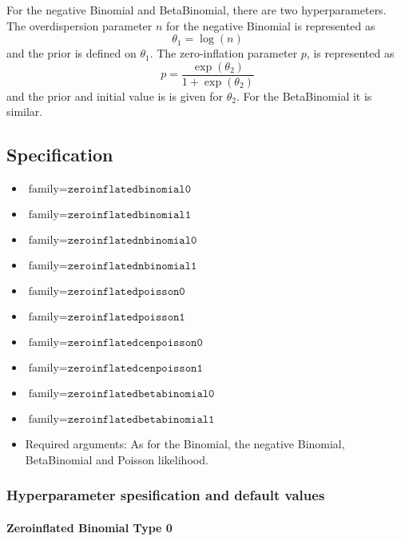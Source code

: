 \documentclass[a4paper,11pt]{article}
\begin{document}
For the negative Binomial and BetaBinomial, there are two
hyperparameters.  The overdispersion parameter $n$ for the negative
Binomial is represented as
\begin{displaymath}
    \theta_{1} = \log(n)
\end{displaymath}
and the prior is defined on $\theta_{1}$. The zero-inflation parameter
$p$, is represented as
\begin{displaymath}
    p = \frac{\exp(\theta_{2})}{1+\exp(\theta_{2})}
\end{displaymath}
and the prior and initial value is is given for $\theta_{2}$. For the
BetaBinomial it is similar.

\subsection*{Specification}

\begin{itemize}
\item $\text{family}=\texttt{zeroinflatedbinomial0}$
\item $\text{family}=\texttt{zeroinflatedbinomial1}$
\item $\text{family}=\texttt{zeroinflatednbinomial0}$
\item $\text{family}=\texttt{zeroinflatednbinomial1}$
\item $\text{family}=\texttt{zeroinflatedpoisson0}$
\item $\text{family}=\texttt{zeroinflatedpoisson1}$
\item $\text{family}=\texttt{zeroinflatedcenpoisson0}$
\item $\text{family}=\texttt{zeroinflatedcenpoisson1}$
\item $\text{family}=\texttt{zeroinflatedbetabinomial0}$
\item $\text{family}=\texttt{zeroinflatedbetabinomial1}$
\item Required arguments: As for the Binomial, the negative Binomial,
    BetaBinomial and Poisson likelihood.
\end{itemize}

\subsubsection*{Hyperparameter spesification and default values}
\paragraph{Zeroinflated Binomial Type 0}

\end{document}
